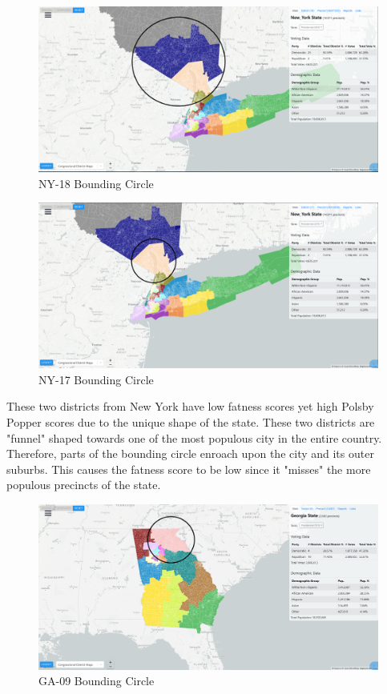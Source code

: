 \documentclass[letterpaper]{article}
\begin{document}
\begin{figure}[H]
	\includegraphics[width=\linewidth]{./figures/NY-18-BoundingCircle.png}
	\caption{NY-18 Bounding Circle}
	\label{fig:ny18boundingCircle}
\end{figure}

\begin{figure}[H]
	\includegraphics[width=\linewidth]{./figures/NY-17-BoundingCircle.png}
	\caption{NY-17 Bounding Circle}
	\label{fig:ny17boundingCircle}
\end{figure}

These two districts from New York have low fatness scores yet high Polsby Popper scores due to the unique shape of the state. These two districts are "funnel" shaped towards one of the most populous city in the entire country. Therefore, parts of the bounding circle enroach upon the city and its outer suburbs. This causes the fatness score to be low since it "misses" the more populous precincts of the state.

\begin{figure}[H]
	\includegraphics[width=\linewidth]{./figures/GA-09-BoundingCircle.png}
	\caption{GA-09 Bounding Circle}
	\label{fig:ga09boundingCircle}
\end{figure}
\end{document}
